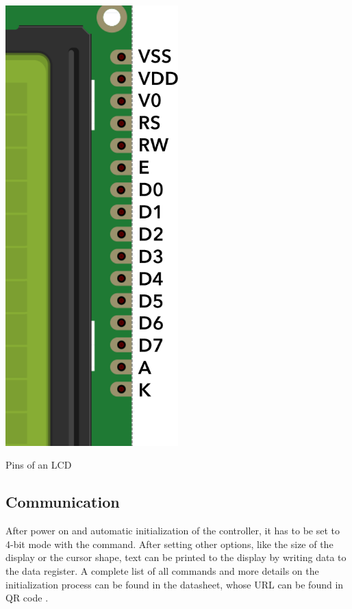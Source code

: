 \begin{marginfigure}[-7cm]
    \centering
    \includegraphics[width=0.5\textwidth]{felix/resources/lcd_pins.png}
    \caption{Pins of an LCD}
    \label{fig:lcd_pins}
\end{marginfigure}

\subsection{Communication}

After power on and automatic initialization of the controller, it has to be set to 4-bit mode with the  command. After setting other options, like the size of the display or the cursor shape, text can be printed to the display by writing data to the data register. A complete list of all commands and more details on the initialization process can be found in the datasheet, whose URL can be found in QR code . %

